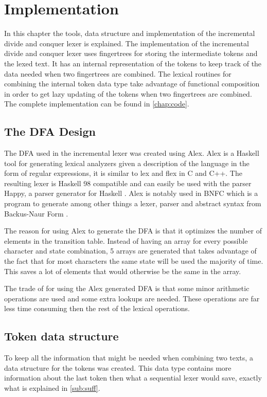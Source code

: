 \chapter{Implementation}\label{chap:imp}
In this chapter the tools, data structure and implementation of the incremental
divide and conquer lexer is explained. The implementation of the incremental
divide and conquer lexer uses fingertrees for storing the intermediate tokens
and the lexed text. It has an internal representation of the tokens to keep
track of the data needed when two fingertrees are combined. The lexical routines
for combining the internal token data type take advantage of functional
composition in order to get lazy updating of the tokens when two fingertrees are
combined. The complete implementation can be found in \cref{chap:code}.

\section{The DFA Design}
The DFA used in the incremental lexer was created using Alex. Alex is a Haskell
tool for generating lexical analyzers given a
description of the language in the form of regular expressions, it is similar to
lex and flex in C and C++. The resulting lexer is Haskell 98 compatible and can
easily be used with the parser Happy, a parser generator for Haskell \cite{alex}.
Alex is notably used in BNFC which is a program to generate among other things a
lexer, parser and abstract syntax from Backus-Naur Form \cite{bnfc}.

The reason for using Alex to generate the DFA is that it optimizes the number of
elements in the transition table. Instead of
having an array for every possible character and state combination, 5 arrays are
generated that takes advantage of the fact that for most characters the same
state will be used the majority of time. This saves a lot of elements that
would otherwise be the same in the array.

The trade of for using the Alex generated DFA is that some minor arithmetic
operations are used and some extra lookups are needed. These operations
are far less time consuming then the rest of the lexical operations.

\section{Token data structure}
To keep all the information that might be needed when combining two texts, a data
structure for the tokens was created. This data type contains more information
about the last token then what a sequential lexer would save, exactly what is
explained in \cref{sub:suff}.

